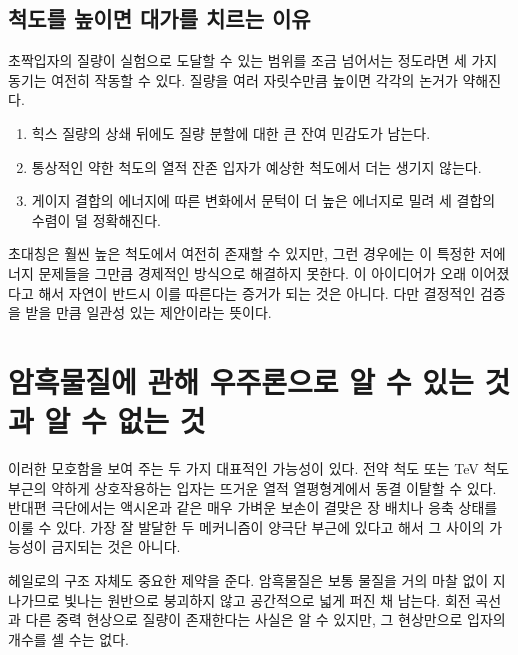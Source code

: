 \subsection{척도를 높이면 대가를 치르는 이유}

초짝입자의 질량이 실험으로 도달할 수 있는 범위를 조금 넘어서는 정도라면 세 가지 동기는 여전히 작동할 수 있다. 질량을 여러 자릿수만큼 높이면 각각의 논거가 약해진다.
\begin{enumerate}\item 힉스 질량의 상쇄 뒤에도 질량 분할에 대한 큰 잔여 민감도가 남는다.
\item 통상적인 약한 척도의 열적 잔존 입자가 예상한 척도에서 더는 생기지 않는다.
\item 게이지 결합의 에너지에 따른 변화에서 문턱이 더 높은 에너지로 밀려 세 결합의 수렴이 덜 정확해진다.
\end{enumerate}
초대칭은 훨씬 높은 척도에서 여전히 존재할 수 있지만, 그런 경우에는 이 특정한 저에너지 문제들을 그만큼 경제적인 방식으로 해결하지 못한다. 이 아이디어가 오래 이어졌다고 해서 자연이 반드시 이를 따른다는 증거가 되는 것은 아니다. 다만 결정적인 검증을 받을 만큼 일관성 있는 제안이라는 뜻이다.

\section{암흑물질에 관해 우주론으로 알 수 있는 것과 알 수 없는 것}

\begin{classroomqa}
\end{classroomqa}

이러한 모호함을 보여 주는 두 가지 대표적인 가능성이 있다. 전약 척도 또는 TeV 척도 부근의 약하게 상호작용하는 입자는 뜨거운 열적 열평형계에서 동결 이탈할 수 있다. 반대편 극단에서는 액시온과 같은 매우 가벼운 보손이 결맞은 장 배치나 응축 상태를 이룰 수 있다. 가장 잘 발달한 두 메커니즘이 양극단 부근에 있다고 해서 그 사이의 가능성이 금지되는 것은 아니다.

헤일로의 구조 자체도 중요한 제약을 준다. 암흑물질은 보통 물질을 거의 마찰 없이 지나가므로 빛나는 원반으로 붕괴하지 않고 공간적으로 넓게 퍼진 채 남는다. 회전 곡선과 다른 중력 현상으로 질량이 존재한다는 사실은 알 수 있지만, 그 현상만으로 입자의 개수를 셀 수는 없다.

